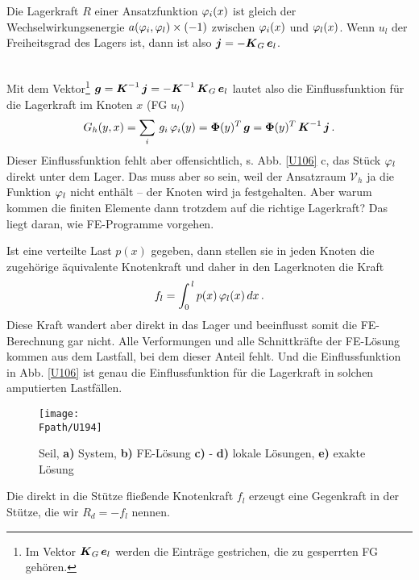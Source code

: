 {{{\hspace*{-12pt}\colorbox{highlightBlue}{\parbox{0.98\textwidth}{Die Lagerkraft $R$ einer Ansatzfunktion $\varphi_i(x)$ ist gleich der Wechselwirkungsenergie $a(\varphi_i,\varphi_l) \times (-1)$  zwischen $\varphi_i(x)$ und $\varphi_l(x)$. Wenn $u_l$ der Freiheitsgrad des Lagers ist, dann ist also $\mbox{\boldmath $j$} = -\mbox{\boldmath $K$}_G\,\mbox{\boldmath $e$}_l$.}}\\

Mit dem Vektor\footnote{Im Vektor $\mbox{\boldmath $K$}_G\,\mbox{\boldmath $e$}_l$ werden die Eintr\"{a}ge gestrichen, die zu gesperrten FG geh\"{o}ren.} $\mbox{\boldmath $g$} = \mbox{\boldmath $K$}^{-1}\,\mbox{\boldmath $j$} = -\mbox{\boldmath $K$}^{-1}\,\mbox{\boldmath $K$}_G\,\mbox{\boldmath $e$}_l$ lautet also die Einflussfunktion f\"{u}r die Lager\-kraft im Knoten $x$ (FG $u_l$)
\begin{align}
G_h(y,x) = \sum_i\,g_i\,\varphi_i(y) = \mbox{\boldmath $\Phi$}(y)^T\,\mbox{\boldmath $g$} = \mbox{\boldmath $\Phi$}(y)^T\,\mbox{\boldmath $K$}^{-1}\,\mbox{\boldmath $j$}  \,.
\end{align}
Dieser Einflussfunktion fehlt aber offensichtlich, s. Abb. \ref{U106} c, das St\"{u}ck $\varphi_l$ direkt unter  dem Lager. Das muss aber so sein, weil der Ansatzraum $\mathcal{V}_h$ ja die Funktion $\varphi_l$ nicht enth\"{a}lt -- der Knoten wird ja festgehalten. Aber warum kommen die finiten Elemente dann trotzdem auf die richtige Lagerkraft? Das liegt daran, wie FE-Programme vorgehen.


Ist eine verteilte Last $p(x)$ gegeben, dann stellen sie in jeden Knoten die zugeh\"{o}rige \"{a}quivalente Knotenkraft und daher in den Lagerknoten die Kraft
\begin{align}
f_l = \int_0^{\,l} p(x)\,\varphi_l(x)\,dx\,.
\end{align}
Diese Kraft wandert aber direkt in das Lager und beeinflusst somit die FE-Berechnung gar nicht. Alle Verformungen und alle Schnittkr\"{a}fte der FE-L\"{o}sung kommen aus dem Lastfall, bei dem dieser Anteil fehlt. Und die Einflussfunktion in Abb. \ref{U106} ist genau die Einflussfunktion  f\"{u}r die Lagerkraft in solchen \glq amputierten\grq{} Lastf\"{a}llen.
\begin{figure}[tbp]
\centering
\texttt{[image: \\Fpath/U194]}
\caption{Seil, \textbf{ a)} System, \textbf{ b)} FE-L\"{o}sung \textbf{ c)} -   \textbf{ d)} lokale L\"{o}sungen, \textbf{ e)} exakte L\"{o}sung} \label{U194}
\end{figure}%

Die direkt in die St\"{u}tze flie{\ss}ende Knotenkraft $f_l$ erzeugt eine Gegenkraft in der St\"{u}tze, die wir $R_{d} = - f_l$ nennen.

}}}
